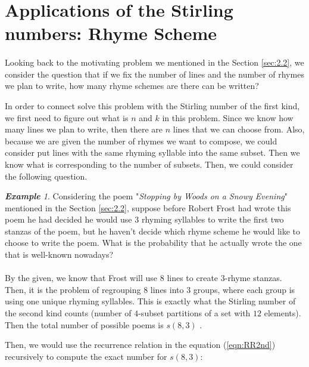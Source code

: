 \documentclass{article}
\theoremstyle{definition}
\theoremstyle{remark}
\theoremstyle{example}
\newtheorem{example}{\textbf{Example}}[section]
\begin{document}
\section{Applications of the Stirling numbers: Rhyme Scheme}
\paragraph{  }

Looking back to the motivating problem we mentioned in the Section \ref{sec:2.2}, we consider the question that if we fix the number of lines and the number of rhymes we plan to write, how many rhyme schemes are there can be written?

In order to connect solve this problem with the Stirling number of the first kind, we first need to figure out what is $n$ and $k$ in this problem. Since we know how many lines we plan to write, then there are $n$ lines that we can choose from. Also, because we are given the number of rhymes we want to compose, we could consider put lines with the same rhyming syllable into the same subset. Then we know what is corresponding to the number of subsets. Then, we could consider the following question.

\begin{example}

Considering the poem "\textit{Stopping by Woods on a Snowy Evening}" mentioned in the Section \ref{sec:2.2}, suppose before Robert Frost had wrote this poem he had decided he would use $3$ rhyming syllables to write the first two stanzas of the poem, but he haven't decide which rhyme scheme he would like to choose to write the poem. What is the probability that he actually wrote the one that is well-known nowadays?
\end{example}

\paragraph{  }

By the given, we know that Frost will use $8$ lines to create $3$-rhyme stanzas. Then, it is the problem of regrouping $8$ lines into $3$ groups, where each group is using one unique rhyming syllables. This is exactly what the Stirling number of the second kind counts (number of $4$-subset partitions of a set with $12$ elements). Then the total number of possible poems is $s(8,3)$ \cite{pollard_c_2003}.

Then, we would use the recurrence relation in the equation (\ref{eqn:RR2nd}) recursively to compute the exact number for $s(8,3)$:
\end{document}

